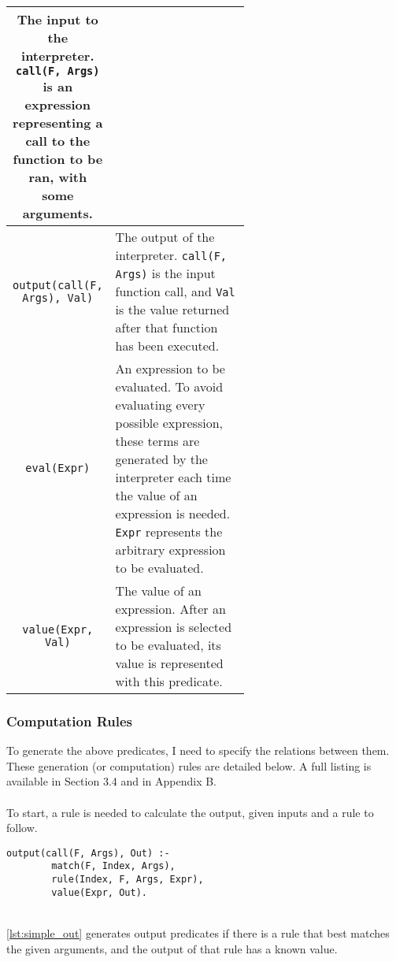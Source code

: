\begin{longtable}[c]{| c | m{0.6\linewidth} |}
The input to the interpreter. \lstinline!call(F, Args)! is an expression representing a call to the function to be ran, with some arguments. \newline
\\
\hline
\lstinline!output(call(F, Args), Val)! 
& 
\mbox{}\newline
The output of the interpreter. \lstinline!call(F, Args)! is the input function call, and \lstinline!Val! is the value returned after that function has been executed. \newline
\\
\hline
\lstinline!eval(Expr)! 
& 
\mbox{}\newline
An expression to be evaluated. To avoid evaluating every possible expression, these terms are generated by the interpreter each time the value of an expression is needed. \newline
\lstinline!Expr! represents the arbitrary expression to be evaluated. \newline 
\\
\hline
\lstinline!value(Expr, Val)! 
& 
\mbox{}\newline
The value of an expression. After an expression is selected to be evaluated, its value is represented with this predicate.\newline 
\\
\hline
\end{longtable}
 
\subsubsection{Computation Rules}
To generate the above predicates, I need to specify the relations between them. These generation (or computation) rules are detailed below. A full listing is available in Section 3.4 and in Appendix B.\\ \\
To start, a rule is needed to calculate the output, given inputs and a rule to follow. \\

\begin{lstlisting}[caption={Output generation}, label={lst:simple_out}, firstnumber=55]
output(call(F, Args), Out) :- 
		match(F, Index, Args), 
		rule(Index, F, Args, Expr), 
		value(Expr, Out).	
\end{lstlisting}
\mbox{} \\
\ref{lst:simple_out} generates output predicates if there is a rule that best matches the given arguments, and the output of that rule has a known value. \\

